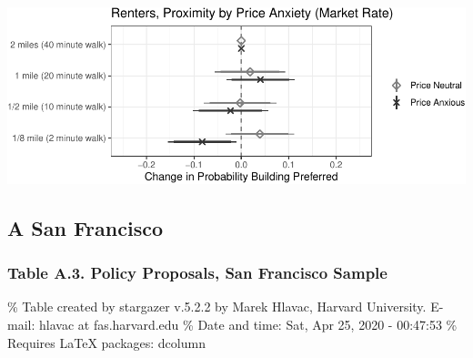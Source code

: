 \documentclass[]{article}
\begin{document}
\includegraphics{Zheng-Ruth-Renters-Paper_files/figure-latex/Figure 7 print-1.pdf}

\hypertarget{a-san-francisco}{%
\subsection{A San Francisco}\label{a-san-francisco}}

\hypertarget{table-a.3.-policy-proposals-san-francisco-sample}{%
\subsubsection{Table A.3. Policy Proposals, San Francisco Sample}\label{table-a.3.-policy-proposals-san-francisco-sample}}

\% Table created by stargazer v.5.2.2 by Marek Hlavac, Harvard University. E-mail: hlavac at fas.harvard.edu
\% Date and time: Sat, Apr 25, 2020 - 00:47:53
\% Requires LaTeX packages: dcolumn
\end{document}
